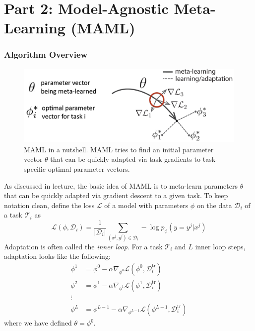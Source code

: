 \documentclass[12pt]{article}
\newcommand{\dataset}{\mathcal{D}}
\newcommand{\task}{\mathcal{T}}
\newcommand{\supportdata}{\mathcal{D}^\mathrm{tr}}
\begin{document}
\newpage
\section*{Part 2: Model-Agnostic Meta-Learning (MAML)~\cite{maml}}

\subsubsection*{Algorithm Overview}

\begin{figure}[H]
\centering
\includegraphics[width=0.8\linewidth]{figures/MAML.png}
\vspace{-3mm}
\caption{MAML in a nutshell. MAML tries to find an initial parameter vector $\theta$ that can be quickly adapted via task gradients to task-specific optimal parameter vectors.}
\label{fig:maml}
\end{figure}

As discussed in lecture, the basic idea of MAML is to meta-learn parameters $\theta$ that can be quickly adapted via gradient descent to a given task. To keep notation clean, define the loss $\mathcal{L}$ of a model with parameters $\phi$ on the data $\dataset_i$ of a task $\task_i$ as
\begin{equation}\label{eq:maml loss}
    \mathcal{L}(\phi, \dataset_i) = \frac{1}{\lvert \dataset_i \rvert} \sum_{(x^j, y^j) \in \dataset_i} -\log p_\phi (y = y^j | x^j)
\end{equation}
Adaptation is often called the \emph{inner loop}. For a task $\task_i$ and $L$ inner loop steps, adaptation looks like the following:
\begin{equation}
\begin{aligned}
    \phi^1 &= \phi^0 - \alpha \nabla_{\phi^0} \mathcal{L}(\phi^0, \supportdata_i) \\
    \phi^2 &= \phi^1 - \alpha \nabla_{\phi^1} \mathcal{L}(\phi^1, \supportdata_i) \\
    \vdots \\
    \phi^L &= \phi^{L-1} - \alpha \nabla_{\phi^{L-1}} \mathcal{L}(\phi^{L-1}, \supportdata_i)
\end{aligned}
\end{equation}
where we have defined $\theta = \phi^0$.
\end{document}
